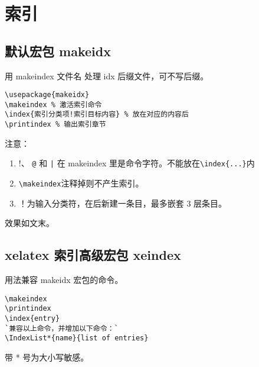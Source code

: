 \section{索引}

\subsection{默认宏包 makeidx}
用\textcolor[rgb]{1.00,0.00,0.00}{ makeindex 文件名 }处理 idx 后缀文件，可不写后缀。
\begin{shaded}
\begin{Verbatim}
\usepackage{makeidx}
\makeindex % 激活索引命令
\index{索引分类项!索引目标内容} % 放在对应的内容后
\printindex % 输出索引章节
\end{Verbatim}
\end{shaded}
注意：\\
\begin{enumerate}
  \item !、 \verb|@| 和 \verb$|$ 在 makeindex 里是命令字符。不能放在\verb|\index{...}|内
  \item \verb|\makeindex|注释掉则不产生索引。
  \item ！为输入分类符，在后新建一条目，最多嵌套 3 层条目。
\end{enumerate}
效果如文末。

\subsection{xelatex 索引高级宏包 xeindex}

用法兼容 makeidx 宏包的命令。
\begin{lstlisting}[language={[LaTeX]TeX}]
\makeindex
\printindex
\index{entry}
`兼容以上命令，并增加以下命令：`
\IndexList*{name}{list of entries}
\end{lstlisting}
带 * 号为大小写敏感。